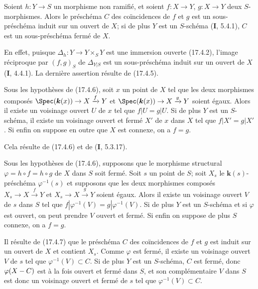 \begin{proposition}[17.4.6]
\label{IV.17.4.6}
Soient $h:Y\to S$ un morphisme non ramifié, et soient $f:X\to Y$, $g:X\to Y$ deux $S$-morphismes. Alors le préschéma $C$ des coïncidences de $f$ et $g$ est un sous-préschéma induit sur un ouvert de $X$; si de plus $Y$ est un $S$-schéma \textup{(\textbf{I}, 5.4.1)}, $C$ est un sous-préschéma fermé de $X$.
\end{proposition}

En effet, puisque $\Delta_h:Y\to Y\times_S Y$ est une immersion ouverte (17.4.2), l'image réciproque par $(f,g)_S$ de $\Delta_{Y|S}$ est un sous-préschéma induit sur un ouvert de $X$ (\textbf{I}, 4.4.1). La dernière assertion résulte de (17.4.5).

\begin{corollary}[17.4.7]
\label{IV.17.4.7}
Sous les hypothèses de \textup{(17.4.6)}, soit $x$ un point de $X$ tel que les deux morphismes composés $\Spec(\boldsymbol{k}(x))\to X\xrightarrow{f}Y$ et $\Spec(\boldsymbol{k}(x))\to X\xrightarrow{g}Y$ soient égaux. Alors il existe un voisinage ouvert $U$ de $x$ tel que $f|U=g|U$. Si de plus $Y$ est un $S$-schéma, il existe un voisinage ouvert et fermé $X'$ de $x$ dans $X$ tel que $f|X'=g|X'$. Si enfin on suppose en outre que $X$ est connexe, on a $f=g$.
\end{corollary}

Cela résulte de (17.4.6) et de (\textbf{I}, 5.3.17).

\begin{corollary}[17.4.8]
\label{IV.17.4.8}
Sous les hypothèses de \textup{(17.4.6)}, supposons que le morphisme structural $\varphi=h\circ f=h\circ g$ de $X$ dans $S$ soit fermé. Soit $s$ un point de $S$; soit $X_s$ le $\boldsymbol{k}(s)$-préschéma $\varphi^{-1}(s)$ et supposons que les deux morphismes composés $X_s\to X\xrightarrow{f}Y$ et $X_s\to X\xrightarrow{g}Y$ soient égaux. Alors il existe un voisinage ouvert $V$ de $s$ dans $S$ tel que $f|\varphi^{-1}(V)=g|\varphi^{-1}(V)$. Si de plus $Y$ est un $S$-schéma et si $\varphi$ est ouvert, on peut prendre $V$ ouvert et fermé. Si enfin on suppose de plus $S$ connexe, on a $f=g$.
\end{corollary}

Il résulte de (17.4.7) que le préschéma $C$ des coïncidences de $f$ et $g$ est induit sur un ouvert de $X$ et contient $X_s$. Comme $\varphi$ est fermé, il existe un voisinage ouvert $V$ de $s$ tel que $\varphi^{-1}(V)\subset C$. Si de plus $Y$ est un $S$-schéma, $C$ est fermé, donc $\varphi(X- C)$ est à la
fois ouvert et fermé dans $S$, et son complémentaire $V$ dans $S$ est donc un voisinage ouvert et fermé de $s$ tel que $\varphi^{-1}(V)\subset C$.

